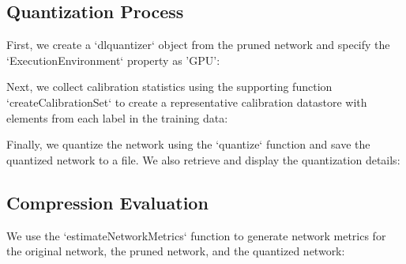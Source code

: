 \documentclass[a4paper]{report}
\begin{document}
{\subsection{Quantization Process}
First, we create a `dlquantizer` object from the pruned network and specify the `ExecutionEnvironment` property as 'GPU':

\begin{center}
\end{center}

Next, we collect calibration statistics using the supporting function `createCalibrationSet` to create a representative calibration datastore with elements from each label in the training data:

\begin{center}
\end{center}

Finally, we quantize the network using the `quantize` function and save the quantized network to a file. We also retrieve and display the quantization details:

\begin{center}
\end{center}

\subsection{Compression Evaluation}
We use the `estimateNetworkMetrics` function to generate network metrics for the original network, the pruned network, and the quantized network:

}
\end{document}
